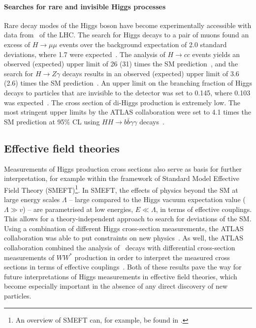 \paragraph{Searches for rare and invisible Higgs processes}
Rare decay modes of the Higgs boson have become experimentally accessible with data from \RunTwo\ of the LHC. 
The search for Higgs decays to a pair of muons found an excess of $H \to \mu\mu$ events over the background expectation of 2.0 standard deviations, where 1.7 were expected~\cite{HIGG-2019-14}.
The analysis of $H \to cc$ events yields an observed (expected) upper limit of 26 (31) times the SM prediction~\cite{ATLAS-CONF-2021-021}, and the search for $H \to Z\gamma$ decays results in an observed (expected) upper limit of 3.6 (2.6) times the SM prediction~\cite{HIGG-2018-42}.
An upper limit on the branching fraction of Higgs decays to particles that are invisible to the detector was set to 0.145, where 0.103 was expected~\cite{ATLASInvisible1}.
The cross section of di-Higgs production is extremely low. The most stringent upper limits by the ATLAS collaboration were set to 4.1 times the SM prediction at 95\% CL using $HH \to b\bar{b}\gamma\gamma$ decays~\cite{ATLAS-CONF-2021-016}.





\subsection{Effective field theories}
Measurements of Higgs production cross sections also serve as basis for further interpretation, for example within the framework of Standard Model Effective Field Theory (SMEFT)\footnote{An overview of SMEFT can, for example, be found in \ccite{}.}. In SMEFT, the effects of physics beyond the SM at large energy scales $\Lambda$ -- large compared to the Higgs vacuum expectation value ($\Lambda \gg v$) -- are parametrised at low energies, $E \ll \Lambda$, in terms of effective couplings. 
This allows for a theory-independent approach to search for deviations of the SM. 
Using a combination of different Higgs cross-section measurements, the ATLAS collaboration was able to put constraints on new physics~\cite{ATLAS-CONF-2020-053}.
As well, the ATLAS collaboration combined the analysis of \HWW\ decays with differential cross-section measurements of $WW^*$ production in order to interpret the measured cross sections in terms of effective couplings~\cite{ATL-PHYS-PUB-2021-010}.
Both of these results pave the way for future interpretations of Higgs measurements in effective field theories, which become especially important in the absence of any direct discovery of new particles. 

